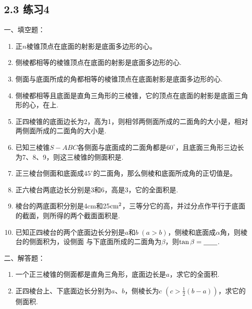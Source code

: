 \subsection*{2.3 练习4}
一、填空题：
\begin{enumerate}
\item 正$n$棱锥顶点在底面的射影是底面多边形的\blank 心。
\item 侧棱都相等的棱锥顶点在底面的射影是底面多边形的\blank 心.
\item 侧面与底面所成的角都相等的棱锥顶点在底面射影是底面多边形的\blank 心.
\item 侧棱都相等且底面是直角三角形的三棱锥，它的顶点在底面的射影是底面三角形的\blank 心，在\blank 上.
\item 正四棱锥的底面边长为2，高为1，则相邻两侧面所成的二面角的大小是\blank ，相对两侧面所成的二面角的大小是\blank .
\item 已知三棱锥$S-ABC$各侧面与底面成的二面角都是$60^{\circ}$，且底面三角形三边长为7、8、9，则这三棱锥的侧面积是\blank .
\item 正三棱台侧面和底面成$45^{\circ}$的二面角，那么侧棱和底面所成角的正切值是\blank 。
\item 正六棱台两底边长分别是3和6，高是3，它的全面积是\blank .
\item 棱台的两底面积分别是4cm和25${\rm cm^2}$，三等分它的高，并过分点作平行于底面的截面，则所得的两个截面面积是\blank .
\item 已知正四棱台的两个底面边长分别是$a$和$b\; (a>b)$，侧棱和底面成$\alpha$角，则棱台的侧面积为\blank ，设侧面 
与下底面所成的二面角为$\beta$，则$\tan\beta=\underline{\qquad}$.
\end{enumerate}

二、解答题：
\begin{enumerate}
\item 一个正三棱锥的侧面都是直角三角形，底面边长是$a$，求它的全面积.
\item 正四棱台上、下底面边长分别为$a$、$b$，侧棱长为$c$ $\left(c>\frac{1}{2}(b-a)\right)$，求它的侧面积.
\end{enumerate}

